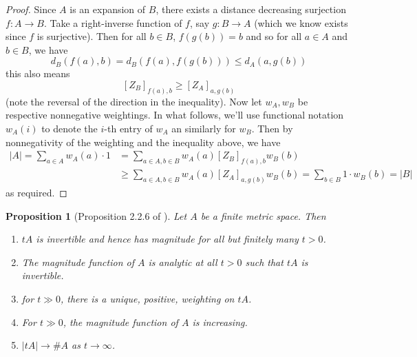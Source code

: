 \documentclass[11pt]{article}
\theoremstyle{mythm}
\newtheorem{prop}[defn]{Proposition}
\begin{document}
\begin{proof}
Since $A$ is an expansion of $B$, there exists a distance decreasing surjection $f: A \to B$. Take a right-inverse function of $f$, say $g: B \to A$ (which we know exists since $f$ is surjective). Then for all $b \in B$, $f(g(b)) = b$ and so for all $a \in A$ and $b \in B$, we have
\begin{equation*}
d_{B}(f(a),b) = d_{B}(f(a),f(g(b))) \leq d_{A}(a,g(b))
\end{equation*}
this also means
\begin{equation*}
\left[Z_B\right]_{f(a),b} \geq \left[Z_{A}\right]_{a,g(b)}
\end{equation*}
(note the reversal of the direction in the inequality). Now let $w_A,w_B$ be respective nonnegative weightings. In what follows, we'll use functional notation $w_A(i)$ to denote the $i$-th entry of $w_A$ an similarly for $w_B$. Then by nonnegativity of the weighting and the inequality above, we have
\begin{align*}
\vert A \vert = \sum\limits_{a\in A} w_A(a) \cdot 1 &= \sum\limits_{a\in A, b\in B} w_A(a) \left[Z_{B}\right]_{f(a),b}w_B(b) \\
&\geq \sum\limits_{a\in A, b \in B} w_{A}(a) \left[Z_{A}\right]_{a,g(b)} w_{B}(b) = \sum\limits_{b\in B} 1\cdot w_B(b) = \vert B \vert
\end{align*}
as required.
\end{proof}

\begin{prop}[Proposition 2.2.6 of \cite{leinster_magnitude_2011}]\label{prop:approach}
Let $A$ be a finite metric space. Then
\begin{enumerate}[label=(\roman*)]
\item $tA$ is invertible and hence has magnitude for all but finitely many $t > 0$.
\item The magnitude function of $A$ is analytic at all $t>0$ such that $tA$ is invertible.
\item for $t \gg 0$, there is a unique, positive, weighting on $tA$.
\item For $t \gg 0$, the magnitude function of $A$ is increasing.
\item $\vert tA \vert \to \#A$ as $t \to \infty$.
\end{enumerate}
\end{prop}
\end{document}
